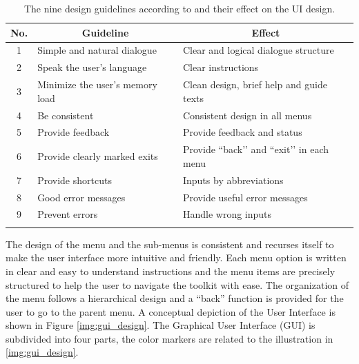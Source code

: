 \begin{table}[!ht]
\begin{center}
\begin{tabular}{cll}
\toprule
\multicolumn{1}{c}{\textbf{No.}} &\multicolumn{1}{c}{\textbf{Guideline}} & \multicolumn{1}{c}{\textbf{Effect}}\\
\midrule
\hline
1 & Simple and natural dialogue & Clear and logical dialogue structure\\

2 & Speak the user’s language & Clear instructions\\

3 & Minimize the user’s memory load & Clean design, brief help and guide texts\\

4 & Be consistent & Consistent design in all menus\\

5 & Provide feedback & Provide feedback and status\\

6 & Provide clearly marked exits & Provide ``back’’ and ``exit’’ in each menu\\

7 & Provide shortcuts & Inputs by abbreviations \\

8 & Good error messages & Provide useful error messages\\

9 & Prevent errors & Handle wrong inputs \\
\hline
\addlinespace
\bottomrule
\end{tabular}
\end{center}
\caption{The nine design guidelines according to \cite{67} and their effect on the UI design.}
\label{tab:guidline_design}
\end{table}

The design of the menu and the sub-menus is consistent and recurses itself to make the user interface more intuitive and friendly. Each menu option is written in clear and easy to understand instructions and the menu items are precisely structured to help the user to navigate the toolkit with ease. The organization of the menu follows a hierarchical design and a ``back'' function is provided for the user to go to the parent menu. A conceptual depiction of the User Interface is shown in Figure
\ref{img:gui_design}. The Graphical User Interface (GUI) is subdivided into four parts, the color markers are related to the illustration in \ref{img:gui_design}.

